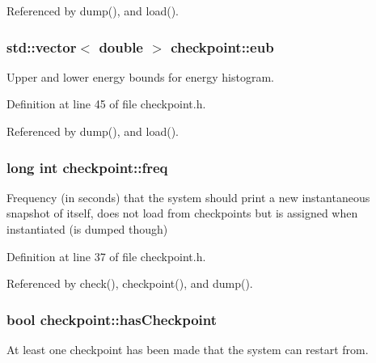 Referenced by dump(), and load().

\hypertarget{classcheckpoint_a7071b01d0936873321d0a706e761b6ac}{
\subsubsection[{eub}]{\setlength{\rightskip}{0pt plus 5cm}std\-::vector$<$ double $>$ checkpoint\-::eub}}\label{classcheckpoint_a7071b01d0936873321d0a706e761b6ac}


Upper and lower energy bounds for energy histogram. 



Definition at line 45 of file checkpoint.\-h.



Referenced by dump(), and load().

\hypertarget{classcheckpoint_a11a2d78eb0bf6045b659a4d18b53da44}{
\subsubsection[{freq}]{\setlength{\rightskip}{0pt plus 5cm}long int checkpoint\-::freq}}\label{classcheckpoint_a11a2d78eb0bf6045b659a4d18b53da44}


Frequency (in seconds) that the system should print a new instantaneous snapshot of itself, does not load from checkpoints but is assigned when instantiated (is dumped though) 



Definition at line 37 of file checkpoint.\-h.



Referenced by check(), checkpoint(), and dump().

\hypertarget{classcheckpoint_aa75f306fcb0c2360d948fa3a61adfed5}{
\subsubsection[{has\-Checkpoint}]{\setlength{\rightskip}{0pt plus 5cm}bool checkpoint\-::has\-Checkpoint}}\label{classcheckpoint_aa75f306fcb0c2360d948fa3a61adfed5}


At least one checkpoint has been made that the system can restart from. 



